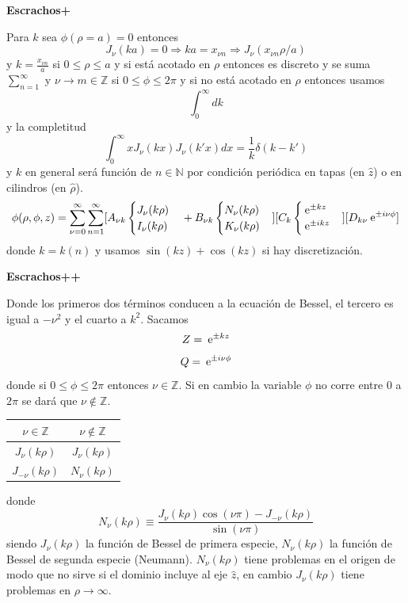 \documentclass[10pt,oneside]{CBFT_book}
\begin{document}
{\bf Escrachos+}


Para $k$ sea $\phi(\rho=a)=0$ entonces 
\[
	J_\nu(ka) = 0 \Rightarrow ka=x_{\nu n} \Rightarrow J_\nu (x_{\nu n} \rho/a)
\]
y $k=\frac{x_{\nu n}}{a}$ si $0\leq \rho \leq a$ y si está acotado en $\rho$ entonces es discreto y se
suma $\sum_{n=1}^\infty$ y $\nu\to m \in \mathbb{Z}$ si $0 \leq \phi \leq 2\pi$ y si no está acotado en
$\rho$ entonces usamos 
\[
	\int_0^\infty dk
\]
y la completitud
\[
	\int_0^\infty x J_\nu(kx) J_\nu(k'x) dx = \frac{1}{k} \delta (k-k')
\]
y $k$ en general será función de $n\in \mathbb{N}$ por condición periódica en tapas (en $\hat{z}$) o en
cilindros (en $\hat{\rho}$).
\[
	\phi(\rho,\phi,z) = \sum_{\nu=0}^\infty \sum_{n=1}^\infty
	[A_{\nu k}\begin{cases} J_\nu(k\rho)  \\ I_\nu(k\rho) \end{cases} + 
	B_{\nu k} \begin{cases} N_\nu(k\rho)  \\ K_\nu(k\rho) \end{cases} ]
	[C_k \begin{cases} \:\mathrm{e}^{\pm kz} \\ \:\mathrm{e}^{\pm ikz} \end{cases}]
	[D_{k\nu} \:\mathrm{e}^{\pm i \nu \phi}]
\]
donde $k=k(n)$ y usamos $\sin(kz)+\cos(kz)$ si hay discretización.

{\bf Escrachos++}

Donde los primeros dos términos conducen a la ecuación de Bessel, el tercero es igual a $-\nu^2$ y el
cuarto a $k^2$. Sacamos
\[
	Z = \:\mathrm{e}^{\pm kz}
\]
\[
	Q = \:\mathrm{e}^{\pm i \nu \phi}
\]
donde si $0\leq \phi \leq 2\pi$ entonces $\nu \in \mathbb{Z}$. Si en cambio la variable $\phi$ no corre 
entre $0$ a $2\pi$ se dará que $\nu \notin \mathbb{Z}$.

\begin{center}
	\begin{tabular}{|c|c|}
	\hline
	$ \nu \in \mathbb{Z} $ & $ \nu \notin \mathbb{Z}  $ \\
	\hline
	$J_\nu(k\rho)$ & $J_\nu(k\rho)$ \\
	$J_{-\nu}(k\rho)$ & $N_\nu(k\rho)$ \\
	\hline
	\end{tabular} 
\end{center}
donde 
\[
	N_\nu(k\rho) \equiv \frac{ J_\nu(k\rho) \cos(\nu\pi) - J_{-\nu}(k\rho)}{\sin(\nu\pi)}
\]
siendo $J_\nu(k\rho)$ la función de Bessel de primera especie, $N_\nu(k\rho)$ la función de Bessel de segunda 
especie (Neumann).
$N_\nu(k\rho)$ tiene problemas en el origen de modo que no sirve si el dominio incluye al eje $\hat{z}$, en 
cambio $J_\nu(k\rho)$ tiene problemas en $\rho\to \infty$.





\end{document}
